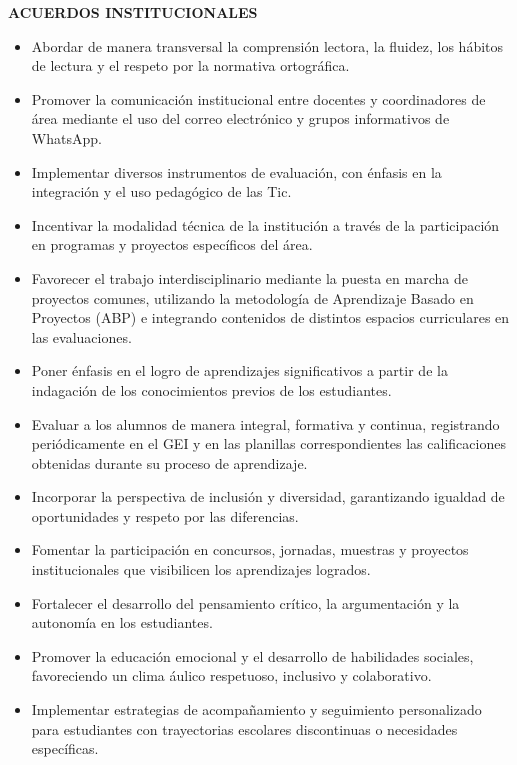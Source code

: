 \documentclass[a4paper,12pt]{article}
\begin{document}
\vspace{0.5cm}

\begin{center}\fontsize{12pt}{14pt}\selectfont
  \textbf{\uppercase{ACUERDOS INSTITUCIONALES}}
\end{center}
\begin{itemize}[leftmargin=*, nosep]
  \item Abordar de manera transversal la comprensión lectora, la
    fluidez, los hábitos de lectura y el respeto por la normativa ortográfica.
  \item Promover la comunicación institucional entre docentes y
    coordinadores de área mediante el uso del correo electrónico y
    grupos informativos de WhatsApp.
  \item Implementar diversos instrumentos de evaluación, con énfasis
    en la integración y el uso pedagógico de las Tic.
  \item Incentivar la modalidad técnica de la institución a través de
    la participación en programas y proyectos específicos del área.
  \item Favorecer el trabajo interdisciplinario mediante la puesta en
    marcha de proyectos comunes, utilizando la metodología de
    Aprendizaje Basado en Proyectos (ABP) e integrando contenidos de
    distintos espacios curriculares en las evaluaciones.
  \item Poner énfasis en el logro de aprendizajes significativos a
    partir de la indagación de los conocimientos previos de los estudiantes.
  \item Evaluar a los alumnos de manera integral, formativa y
    continua, registrando periódicamente en el GEI y en las planillas
    correspondientes las calificaciones obtenidas durante su proceso
    de aprendizaje.
  \item Incorporar la perspectiva de inclusión y diversidad,
    garantizando igualdad de oportunidades y respeto por las diferencias.
  \item Fomentar la participación en concursos, jornadas, muestras y
    proyectos institucionales que visibilicen los aprendizajes logrados.
  \item Fortalecer el desarrollo del pensamiento crítico, la
    argumentación y la autonomía en los estudiantes.
  \item Promover la educación emocional y el desarrollo de
    habilidades sociales, favoreciendo un clima áulico respetuoso,
    inclusivo y colaborativo.
  \item Implementar estrategias de acompañamiento y seguimiento
    personalizado para estudiantes con trayectorias escolares
    discontinuas o necesidades específicas.
\end{itemize}
\end{document}
